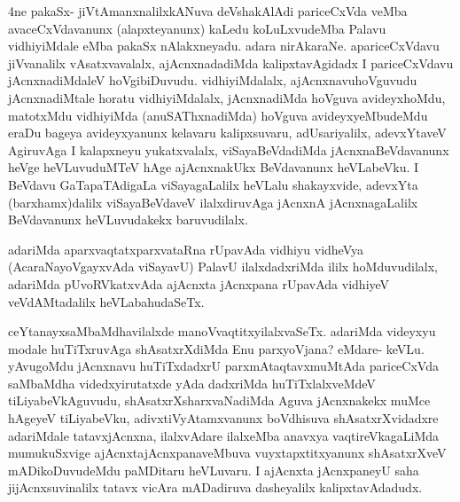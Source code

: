 \begin{artha}
4ne pakaSx- jiVtAmanxnalilxkANuva deVshakAlAdi pariceCxVda veMba
avaceCxVdavanunx (alapxteyanunx) kaLedu koLuLxvudeMba Palavu
vidhiyiMdale eMba pakaSx nAlakxneyadu. adara
nirAkaraNe. apariceCxVdavu jiVvanalilx vAsatxvavalalx, ajAcnxnadadiMda
kalipxtavAgidadx I pariceCxVdavu jAcnxnadiMdaleV
hoVgibiDuvudu. vidhiyiMdalalx, ajAcnxnavuhoVguvudu jAcnxnadiMtale
horatu vidhiyiMdalalx, jAcnxnadiMda hoVguva avideyxhoMdu, matotxMdu
vidhiyiMda (anuSAThxnadiMda) hoVguva avideyxyeMbudeMdu eraDu bageya
avideyxyanunx kelavaru kalipxsuvaru, adUsariyalilx, adevxYtaveV
AgiruvAga I kalapxneyu yukatxvalalx, viSayaBeVdadiMda
jAcnxnaBeVdavanunx heVge heVLuvuduMTeV hAge ajAcnxnakUkx BeVdavanunx
heVLabeVku. I BeVdavu GaTapaTAdigaLa viSayagaLalilx heVLalu
shakayxvide, adevxYta (barxhamx)dalilx viSayaBeVdaveV ilalxdiruvAga
jAcnxnA jAcnxnagaLalilx BeVdavanunx heVLuvudakekx baruvudilalx.

adariMda aparxvaqtatxparxvataRna rUpavAda vidhiyu vidheVya
(AcaraNayoVgayxvAda viSayavU) PalavU ilalxdadxriMda ililx
hoMduvudilalx, adariMda pUvoRVkatxvAda ajAcnxta jAcnxpana rUpavAda
vidhiyeV veVdAMtadalilx heVLabahudaSeTx.
\end{artha}

\begin{center}


\end{center}

\begin{artha}
ceYtanayxsaMbaMdhavilalxde manoVvaqtitxyilalxvaSeTx. adariMda videyxyu
modale huTiTxruvAga shAsatxrXdiMda Enu parxyoVjana? eMdare-
keVLu. yAvugoMdu jAcnxnavu huTiTxdadxrU parxmAtaqtavxmuMtAda
pariceCxVda saMbaMdha videdxyirutatxde yAda dadxriMda huTiTxlalxveMdeV
tiLiyabeVkAguvudu, shAsatxrXsharxvaNadiMda Aguva jAcnxnakekx muMce
hAgeyeV tiLiyabeVku, adivxtiVyAtamxvanunx boVdhisuva shAsatxrXvidadxre
adariMdale tatavxjAcnxna, ilalxvAdare ilalxeMba anavxya
vaqtireVkagaLiMda mumukuSxvige ajAcnxtajAcnxpanaveMbuva
vuyxtapxtitxyanunx shAsatxrXveV mADikoDuvudeMdu paMDitaru heVLuvaru. I
ajAcnxta jAcnxpaneyU saha jijAcnxsuvinalilx tatavx vicAra mADadiruva
dasheyalilx kalipxtavAdadudx.  
\end{artha}
